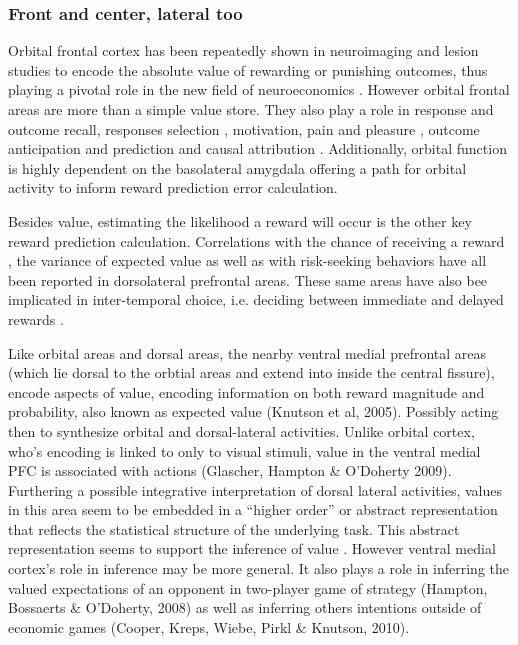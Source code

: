 \documentclass[doc,12pt]{apa}        %
\begin{document}
\subsubsection{Front and center, lateral too}
\label{subsub:fclt}
Orbital frontal cortex has been repeatedly shown in neuroimaging \cite{ODoherty:2001p2423} and lesion \cite{Hornak:2004p6234} studies to encode the absolute value of rewarding or punishing outcomes, thus playing a pivotal role in the new field of neuroeconomics \cite{Glimcher:2005p863}.  However orbital frontal areas are more than a simple value store.  They also play a role in response and outcome recall, responses selection \cite{Rudebeck:2008p4712, Furuyashiki:2008p1631}, motivation, pain and pleasure \cite{Atlas:2010p7566}, outcome anticipation and prediction \cite{Tanaka:2006fk, Roesch:2007p7182} and causal attribution \cite{Tanaka:2008p3265}.  Additionally, orbital function is highly dependent on the basolateral amygdala \cite{ODoherty:2003p2616} offering a path for orbital activity to inform reward prediction error calculation.  

Besides value, estimating the likelihood a reward will occur is the other key reward prediction calculation.  Correlations with the chance of receiving a reward \cite{Tobler:2009p8297}, the variance of expected value \cite{Kahnt:2010p7677} as well as with risk-seeking behaviors \cite{Tobler:2007p1562} have all been reported in dorsolateral prefrontal areas.  These same areas have also bee implicated in inter-temporal choice, i.e. deciding between immediate and delayed rewards \cite{Kim:2009p8304,Kim:2008p2984}.  

Like orbital areas and dorsal areas, the nearby ventral medial prefrontal areas (which lie dorsal to the orbtial areas and extend into inside the central fissure), encode aspects of value, encoding information on both reward magnitude and probability, also known as expected value (Knutson et al, 2005).  Possibly acting then to synthesize orbital and dorsal-lateral activities.  Unlike orbital cortex, who's encoding is linked to only to visual stimuli, value in the ventral medial PFC is associated with actions (Glascher, Hampton \& O’Doherty 2009).   Furthering a possible integrative interpretation of dorsal lateral activities, values in this area seem to be embedded in a ``higher order''  or abstract representation that reflects the statistical structure of the underlying task.  This abstract representation seems to support the inference of value \cite{Hampton:2006p2577}.  However ventral medial cortex's role in inference may be more general. It also plays a role in inferring the valued expectations of an opponent in two-player game of strategy (Hampton, Bossaerts \& O'Doherty, 2008) as well as inferring others intentions outside of economic games (Cooper, Kreps, Wiebe, Pirkl \& Knutson, 2010).
\end{document}
